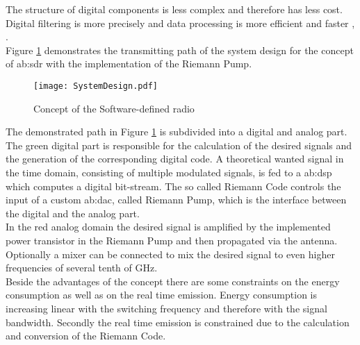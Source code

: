 The structure of digital components is less complex and therefore has less cost.
Digital filtering is more precisely and data processing is more efficient and faster \cite{Chamberlain2015}, \cite{LiRaghunathanJha2009}.\\
Figure \ref{fig:System} demonstrates the transmitting path of the system design for the concept of \gls{ab:sdr} with the implementation of the Riemann Pump.

\begin{figure}[ht]
	\centering
  \texttt{[image: SystemDesign.pdf]}
	\caption{Concept of the Software-defined radio}
	\label{fig:System}
\end{figure}

The demonstrated path in Figure \ref{fig:System} is subdivided into a digital and analog part.
The green digital part is responsible for the calculation of the desired signals and the generation of the corresponding digital code.
A theoretical wanted signal in the time domain, consisting of multiple modulated signals, is fed to a \gls{ab:dsp} which computes a digital bit-stream.
The so called Riemann Code controls the input of a custom \gls{ab:dac}, called Riemann Pump, which is the interface between the digital and the analog part.\\
In the red analog domain the desired signal is amplified by the implemented power transistor in the Riemann Pump and then propagated via the antenna.
Optionally a mixer can be connected to mix the desired signal to even higher frequencies of several tenth of \si{\giga \hertz}.\\
Beside the advantages of the concept there are some constraints on the energy consumption as well as on the real time emission.
Energy consumption is increasing linear with the switching frequency and therefore with the signal bandwidth.
Secondly the real time emission is constrained due to the calculation and conversion of the Riemann Code.

